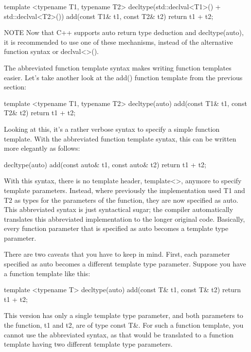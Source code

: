 \begin{cpp}
template <typename T1, typename T2>
decltype(std::declval<T1>() + std::declval<T2>()) add(const T1& t1, const T2& t2)
{
    return t1 + t2;
}
\end{cpp}

\begin{myNotic}{NOTE}
Now that C++ supports auto return type deduction and decltype(auto), it is recommended to use one of these mechanisms, instead of the alternative function syntax or declval<>().
\end{myNotic}


The abbreviated function template syntax makes writing function templates easier. Let’s take another look at the add() function template from the previous section:

\begin{cpp}
template <typename T1, typename T2>
decltype(auto) add(const T1& t1, const T2& t2) { return t1 + t2; }
\end{cpp}

Looking at this, it’s a rather verbose syntax to specify a simple function template. With the abbreviated function template syntax, this can be written more elegantly as follows:

\begin{cpp}
decltype(auto) add(const auto& t1, const auto& t2) { return t1 + t2; }
\end{cpp}

With this syntax, there is no template header, template<>, anymore to specify template parameters. Instead, where previously the implementation used T1 and T2 as types for the parameters of the function, they are now specified as auto. This abbreviated syntax is just syntactical sugar; the compiler automatically translates this abbreviated implementation to the longer original code. Basically, every function parameter that is specified as auto becomes a template type parameter.

There are two caveats that you have to keep in mind. First, each parameter specified as auto becomes a different template type parameter. Suppose you have a function template like this:

\begin{cpp}
template <typename T>
decltype(auto) add(const T& t1, const T& t2) { return t1 + t2; }
\end{cpp}

This version has only a single template type parameter, and both parameters to the function, t1 and t2, are of type const T\&. For such a function template, you cannot use the abbreviated syntax, as that would be translated to a function template having two different template type parameters.

